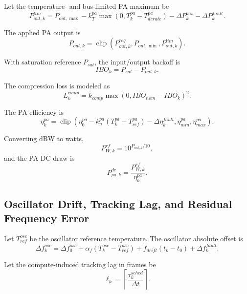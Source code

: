 \documentclass[11pt]{article}
\newcommand{\clip}{\operatorname{clip}}
\begin{document}
Let the temperature- and bus-limited PA maximum be
\begin{equation}
  P^{lim}_{out,k}
  =
  P_{out,\max}
  - k^{pa}_T \max(0, T^{pa}_k - T^{pa}_{derate})
  - \Delta P^{bus}_k
  - \Delta P^{fault}_k.
\end{equation}

The applied PA output is
\begin{equation}
  P_{out,k}
  =
  \clip(P^{req}_{out,k}, P_{out,\min}, P^{lim}_{out,k}).
\end{equation}

With saturation reference $P_{sat}$, the input/output backoff is
\begin{equation}
  IBO_k = P_{sat} - P_{out,k}.
\end{equation}

The compression loss is modeled as
\begin{equation}
  L^{comp}_k
  =
  k_{comp}\max(0, IBO_{nom} - IBO_k)^2.
\end{equation}

The PA efficiency is
\begin{equation}
  \eta^{pa}_k
  =
  \clip\left(
    \eta^{pa}_0
    - k^{pa}_{\eta}(T^{pa}_k - T^{pa}_{ref})
    - \Delta \eta^{fault}_k,
    \eta^{pa}_{min},
    \eta^{pa}_{max}
  \right).
\end{equation}

Converting dBW to watts,
\begin{equation}
  P^{rf}_{W,k} = 10^{P_{out,k}/10},
\end{equation}
and the PA DC draw is
\begin{equation}
  P^{dc}_{pa,k} = \frac{P^{rf}_{W,k}}{\eta^{pa}_k}.
\end{equation}

\subsection{Oscillator Drift, Tracking Lag, and Residual Frequency Error}

Let $T^{osc}_{ref}$ be the oscillator reference temperature.
The oscillator absolute offset is
\begin{equation}
  \Delta f^{osc}_k
  =
  \Delta f^{osc}_0
  + \alpha_f (T^{osc}_k - T^{osc}_{ref})
  + \dot{f}_{drift}(t_k - t_0)
  + \Delta f^{fault}_k.
\end{equation}

Let the compute-induced tracking lag in frames be
\begin{equation}
  \ell_k = \left\lceil \frac{\tau^{sched}_k}{\Delta t} \right\rceil.
\end{equation}
\end{document}
